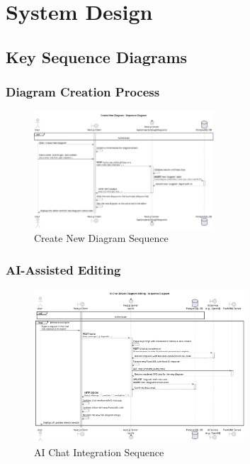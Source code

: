 \section{System Design}


\subsection{Key Sequence Diagrams}

\subsubsection{Diagram Creation Process}
\begin{figure}[H]
\centering
\includegraphics[width=0.6\textwidth]{conception/SprintIV/sequence_diagrams/sequence_diagramManagement_4_1_CreateNewDiagram.png}
\caption{Create New Diagram Sequence}
\end{figure}

\subsubsection{AI-Assisted Editing}
\begin{figure}[H]
\centering
\includegraphics[width=0.7\textwidth]{conception/SprintIV/sequence_diagrams/sequence_workspaceManagement_5_3_ChatWithAIMode.png}
\caption{AI Chat Integration Sequence}
\end{figure}

